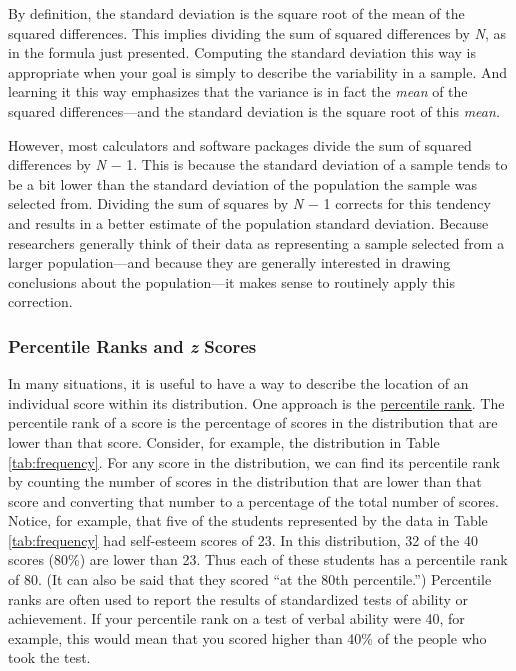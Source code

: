 \documentclass[
]{krantz}
\begin{document}
By definition, the standard deviation is the square root of the mean of the squared differences. This implies dividing the sum of squared differences by \emph{N}, as in the formula just presented. Computing the standard deviation this way is appropriate when your goal is simply to describe the variability in a sample. And learning it this way emphasizes that the variance is in fact the \emph{mean} of the squared differences---and the standard deviation is the square root of this \emph{mean.}

However, most calculators and software packages divide the sum of squared differences by \emph{N} − 1. This is because the standard deviation of a sample tends to be a bit lower than the standard deviation of the population the sample was selected from. Dividing the sum of squares by \emph{N} − 1 corrects for this tendency and results in a better estimate of the population standard deviation. Because researchers generally think of their data as representing a sample selected from a larger population---and because they are generally interested in drawing conclusions about the population---it makes sense to routinely apply this correction.

\subsubsection*{\texorpdfstring{Percentile Ranks and \emph{z} Scores}{Percentile Ranks and z Scores}}\label{percentile-ranks-and-z-scores}


In many situations, it is useful to have a way to describe the location of an individual score within its distribution. One approach is the \hyperref[percentile-rank]{percentile rank}. The percentile rank of a score is the percentage of scores in the distribution that are lower than that score. Consider, for example, the distribution in Table \ref{tab:frequency}. For any score in the distribution, we can find its percentile rank by counting the number of scores in the distribution that are lower than that score and converting that number to a percentage of the total number of scores. Notice, for example, that five of the students represented by the data in Table \ref{tab:frequency} had self-esteem scores of 23. In this distribution, 32 of the 40 scores (80\%) are lower than 23. Thus each of these students has a percentile rank of 80. (It can also be said that they scored ``at the 80th percentile.'') Percentile ranks are often used to report the results of standardized tests of ability or achievement. If your percentile rank on a test of verbal ability were 40, for example, this would mean that you scored higher than 40\% of the people who took the test.
\end{document}
